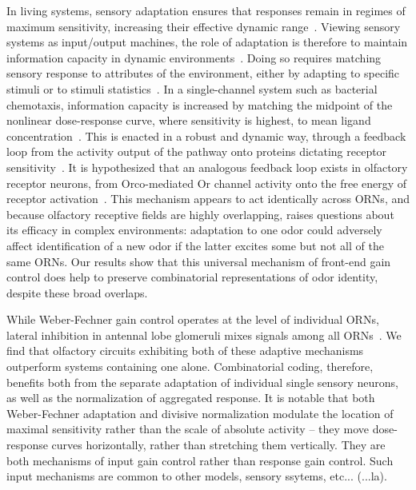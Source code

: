 In living systems, sensory adaptation ensures that responses remain in regimes of maximum sensitivity, increasing their effective dynamic range~\cite{adaptation_fairhall, adaptation_nagel, laughlin, deweese_adaptation}. Viewing sensory systems as input/output machines, the role of adaptation is therefore to maintain information capacity in dynamic environments~\cite{information_theory_adaptation}. Doing so requires matching sensory response to attributes of the environment, either by adapting to specific stimuli or to stimuli statistics~\cite{adaptation_fairhall}. In a single-channel system such as bacterial chemotaxis, information capacity is increased by matching the midpoint of the nonlinear dose-response curve, where sensitivity is highest, to mean ligand concentration~\cite{information_theory_adaptation}. This is enacted in a robust and dynamic way, through a feedback loop from the activity output of the pathway onto proteins dictating receptor sensitivity~\cite{robustness_barkai, robustness_alon}. It is hypothesized that an analogous feedback loop exists in olfactory receptor neurons, from Orco-mediated Or channel activity onto the free energy of receptor activation~\cite{srinivas_elife}. This mechanism appears to act identically across ORNs, and because olfactory receptive fields are highly overlapping, raises questions about its efficacy in complex environments: adaptation to one odor could adversely affect identification of a new odor if the latter excites some but not all of the same ORNs. Our results show that this universal mechanism of front-end gain control does help to preserve combinatorial representations of odor identity, despite these broad overlaps. 

While Weber-Fechner gain control operates at the level of individual ORNs, lateral inhibition in antennal lobe glomeruli mixes signals among all ORNs~\cite{divisive_normalization}. We find that olfactory circuits exhibiting both of these adaptive mechanisms outperform systems containing one alone. 
Combinatorial coding, therefore, benefits both from the separate adaptation of individual single sensory neurons, as well as the normalization of aggregated response. It is notable that both Weber-Fechner adaptation and divisive normalization modulate the location of maximal sensitivity rather than the scale of absolute activity -- they move dose-response curves horizontally, rather than stretching them vertically. They are both mechanisms of input gain control rather than response gain control. {\color{blue} Such input mechanisms are common to other models, sensory ssytems, etc... (...la)}. 

